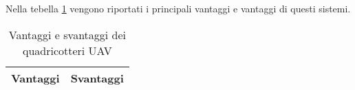 Nella tebella \ref{tab:intro.proecontrouav} vengono riportati i principali vantaggi e vantaggi di questi sistemi.

\begin{table}
	\centering
	\begin{tabular}{ c | c }
		Vantaggi & Svantaggi \\
		\hline
	\end{tabular}
	\caption{Vantaggi e svantaggi dei quadricotteri UAV}
	\label{tab:intro.proecontrouav}
\end{table}